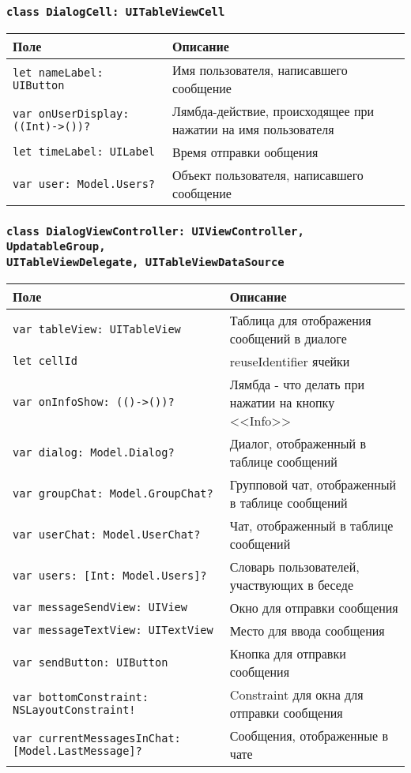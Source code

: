 \subsubsection*{\texttt{class DialogCell: UITableViewCell}}

\begin{longtable}{| >{\raggedright\arraybackslash}p{} | p{}|}
\hline
\textbf{Поле} & \textbf{Описание} \\ \hline
\texttt{let nameLabel: UIButton } & {Имя пользователя, написавшего сообщение} \\ \hline
\texttt{var onUserDisplay: ((Int)->())?} & {Лямбда-действие, происходящее при нажатии на имя пользователя} \\ \hline
\texttt{let timeLabel: UILabel } & {Время отправки ообщения} \\ \hline
\texttt{var user: Model.Users?} & {Объект пользователя, написавшего сообщение} \\ \hline
\end{longtable}

\subsubsection*{\texttt{class DialogViewController: UIViewController, UpdatableGroup,\\ UITableViewDelegate, UITableViewDataSource}}

\begin{longtable}{| >{\raggedright\arraybackslash}p{} | p{}|}
\hline
\textbf{Поле} & \textbf{Описание} \\ \hline
\texttt{var tableView: UITableView } & {Таблица для отображения сообщений в диалоге} \\ \hline
\texttt{let cellId } & {reuseIdentifier ячейки} \\ \hline
\texttt{var onInfoShow: (()->())?} & {Лямбда - что делать при нажатии на кнопку <<Info>>} \\ \hline
\texttt{var dialog: Model.Dialog?} & {Диалог, отображенный в таблице сообщений} \\ \hline
\texttt{var groupChat: Model.GroupChat?} & {Групповой чат, отображенный в таблице сообщений} \\ \hline
\texttt{var userChat: Model.UserChat?} & {Чат, отображенный в таблице сообщений} \\ \hline
\texttt{var users: [Int: Model.Users]?} & {Словарь пользователей, участвующих в беседе} \\ \hline
\texttt{var messageSendView: UIView } & {Окно для отправки сообщения} \\ \hline
\texttt{var messageTextView: UITextView } & {Место для ввода сообщения} \\ \hline
\texttt{var sendButton: UIButton } & {Кнопка для отправки сообщения} \\ \hline
\texttt{var bottomConstraint: NSLayoutConstraint!} & {Constraint для окна для отправки сообщения} \\ \hline
\texttt{var currentMessagesInChat: [Model.LastMessage]?} & {Сообщения, отображенные в чате} \\ \hline
\end{longtable}

